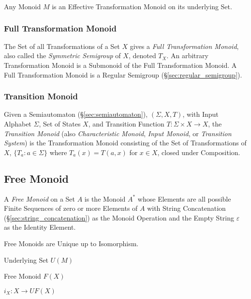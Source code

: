 Any Monoid $M$ is an Effective Transformation Monoid on its underlying
Set.



\subsubsection{Full Transformation Monoid}\label{sec:full_transformation}

The Set of all Transformations of a Set $X$ gives a \emph{Full
  Transformation Monoid}, also called the \emph{Symmetric Semigroup}
of $X$, denoted $T_X$. An arbitrary Transformation Monoid is a
Submonoid of the Full Transformation Monoid. A Full Transformation
Monoid is a Regular Semigroup (\S\ref{sec:regular_semigroup}).



\subsubsection{Transition Monoid}\label{sec:transition_monoid}

Given a Semiautomaton (\S\ref{sec:semiautomaton}), $(\Sigma, X, T)$,
with Input Alphabet $\Sigma$, Set of States $X$, and Transition
Function $T : \Sigma \times X \rightarrow X$, the \emph{Transition
  Monoid} (also \emph{Characteristic Monoid}, \emph{Input Monoid}, or
\emph{Transition System}) is the Transformation Monoid consisting of
the Set of Transformations of $X$, $\{T_a : a \in \Sigma\}$ where
$T_a(x) = T(a,x)$ for $x \in X$, closed under Composition.



\subsection{Free Monoid}\label{sec:free_monoid}

A \emph{Free Monoid} on a Set $A$ is the Monoid $A^*$ whose Elements
are all possible Finite Sequences of zero or more Elements of $A$ with
String Concatenation (\S\ref{sec:string_concatenation}) as the Monoid
Operation and the Empty String $\varepsilon$ as the Identity Element.

Free Monoids are Unique up to Isomorphism.

Underlying Set $U(M)$

Free Monoid $F(X)$

$i_X : X \rightarrow U F (X)$

